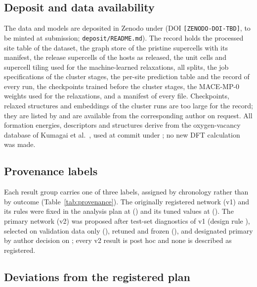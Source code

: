 \subsection{Deposit and data availability}

The data and models are deposited in Zenodo under \ccby{} (DOI \texttt{[ZENODO-DOI-TBD]}, to be minted at
submission; \texttt{deposit/README.md}). The record holds the processed site table of the dataset, the graph store
of the pristine supercells with its manifest, the release supercells of the hosts as released, the unit cells and
supercell tiling used for the machine-learned relaxations, all splits, the job specifications of the cluster stages,
the per-site prediction table and the record of every run, the checkpoints trained before the cluster stages, the
MACE-MP-0 weights used for the relaxations, and a \shatwo{} manifest of every file. Checkpoints, relaxed structures and
embeddings of the cluster runs are too large for the record; they are listed by \shatwo{} and are available from the
corresponding author on request. All formation energies, descriptors and structures derive from the oxygen-vacancy
database of Kumagai et al.\ \citep{Kumagai2021insights}, used at commit \releasecommit{} under \ccby{}; no new DFT
calculation was made.

\subsection{Provenance labels}

Each result group carries one of three labels, assigned by chronology rather than by outcome
(Table~\ref{tab:provenance}). The originally registered network (v1) and its rules were fixed in the analysis plan
at \tagprereg{} (\dateprereg{}) and its tuned values at \tagtuned{} (\datetunedvone{}). The primary network (v2) was
proposed after test-set diagnostics of v1 (design rule \datevtwoprotocol{}), selected on validation data only
(\datevtwoselect{}), retuned and frozen (\datevtwofreeze{}), and designated primary by author decision on
\dateauthordecision{}; every v2 result is post hoc and none is described as registered.

{\small
}

\subsection{Deviations from the registered plan}

